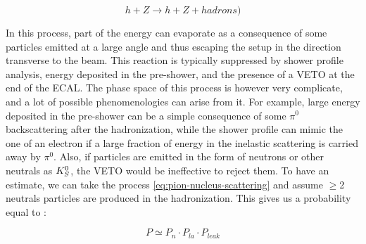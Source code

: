 \begin{equation}
  \label{eq:pion-nucleus-scattering}
  h + Z \longrightarrow h + Z + hadrons)
\end{equation}

In this process, part of the energy can evaporate as a consequence of some particles emitted at a large angle and thus escaping the setup in the direction transverse to the beam. This reaction is typically suppressed by shower profile analysis, energy deposited in the pre-shower, and the presence of a VETO at the end of the ECAL. The phase space of this process is however very complicate, and a lot of possible phenomenologies can arise from it. For example, large energy deposited in the pre-shower can be a simple consequence of some $\pi^0$ backscattering after the hadronization, while the shower profile can mimic the one of an electron if a large fraction of energy in the inelastic scattering is carried away by $\pi^0$. Also, if particles are emitted in the form of neutrons or other neutrals as $K^0_S$, the VETO would be ineffective to reject them. To have an estimate, we can take the process \ref{eq:pion-nucleus-scattering} and assume $\geq$2 neutrals particles are produced in the hadronization. This gives us a probability equal to \cite{gkkk1}:

\begin{equation}
  \label{eq:transverse-leak-estimate}
  P \simeq P_n \cdot P_{la} \cdot P_{leak}
\end{equation}

